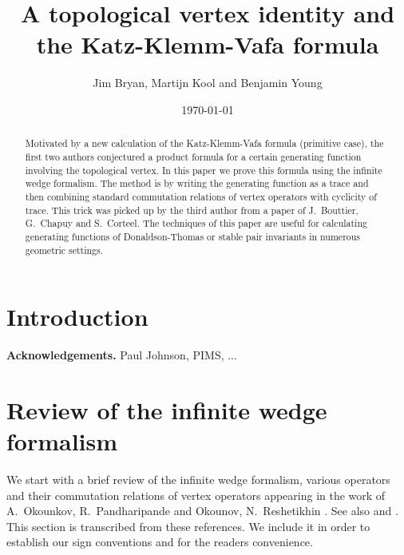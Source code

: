\documentclass{amsart}
\title{A topological vertex identity and the Katz-Klemm-Vafa formula}
\author{Jim Bryan, Martijn Kool and Benjamin Young}
\date{\today}
\theoremstyle{definition}
\begin{document}
\begin{abstract}
Motivated by a new calculation of the Katz-Klemm-Vafa formula (primitive case), the first two authors conjectured a product formula for a certain generating function involving the topological vertex. In this paper we prove this formula using the infinite wedge formalism. The method is by writing the generating function as a trace and then combining standard commutation relations of vertex operators with cyclicity of trace. This trick was picked up by the third author from a paper of J.~Bouttier, G.~Chapuy and S.~Corteel. The techniques of this paper are useful for calculating generating functions of Donaldson-Thomas or stable pair invariants in numerous geometric settings.
\end{abstract}

\maketitle 





\section{Introduction}

\noindent \textbf{Acknowledgements.} Paul Johnson, PIMS, ...


\section{Review of the infinite wedge formalism}

We start with a brief review of the infinite wedge formalism, various operators and their commutation relations of vertex operators appearing in the work of A.~Okounkov, R.~Pandharipande \cite{OP} and Okounov, N.~Reshetikhin \cite{OR2}. See also \cite{Kac} and \cite{You}. This section is transcribed from these references. We include it in order to establish our sign conventions and for the readers convenience.
\end{document}
